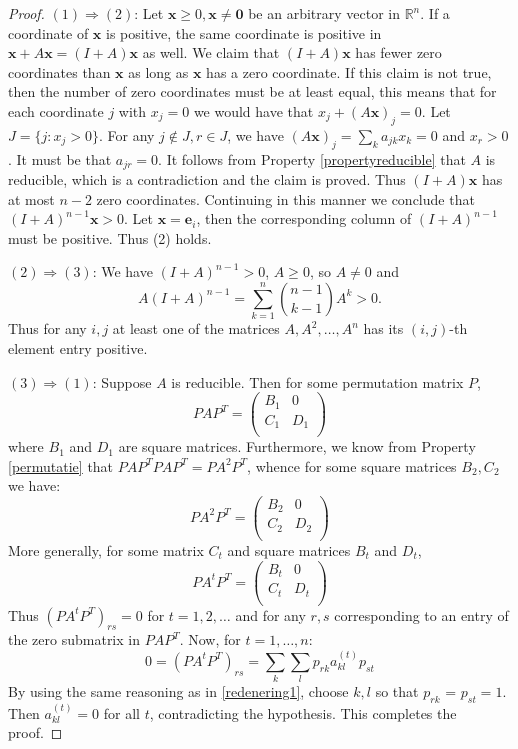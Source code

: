 \documentclass[a4paper,11pt]{report}
\newcommand{\R}{{\mathbb R}}
\begin{document}
\begin{proof}
  
  $(1) \Rightarrow (2)$: Let $\mathbf{x} \geq 0, \mathbf{x} \not = \mathbf{0}$ be an arbitrary vector in $\R^n$.
  If a coordinate of $\mathbf{x}$ is positive, the same coordinate is positive  in $\mathbf{x} + A\mathbf{x} = (I+A)\mathbf{x}$ 
  as well. We claim that $(I+A)\mathbf{x}$ has fewer zero coordinates than 
  $\mathbf{x}$ as long as $\mathbf{x}$ has a zero coordinate. If this claim is 
  not true, then the number of zero coordinates must be at least equal,
  this means that for each coordinate $j$ with $x_j = 0$ we would have that $x_j+ (A\mathbf{x})_j= 0$. Let $J = \{j: x_j > 0\}.$ For any $j \not \in J, r\in J$, we have 
  $(A\mathbf{x})_j = \sum_k a_{jk}x_k = 0$ and $x_r > 0$. 
  It must be that $a_{jr} = 0$. It follows from Property \ref{propertyreducible} that $A$ 
  is reducible, which is a contradiction and the claim is proved. Thus $(I+A)\mathbf{x}$ 
  has at most $n-2$ zero coordinates. Continuing in this manner we conclude that 
  $(I + A)^{n-1}\mathbf{x} > 0$. Let $\mathbf{x} = \mathbf{e}_i$, then the corresponding column of $(I+A)^{n-1}$ must be 
  positive. Thus (2) holds.
  
  $(2) \Rightarrow (3)$: We have $(I + A)^{n-1} > 0$, $A \geq 0$, so $A \not = 0$ 
  and 
  $$A(I+A)^{n-1} = \sum_{k=1}^n {n-1 \choose k-1} A^k > 0.$$
Thus for any $i, j$ at least one of the matrices $A, A^2,\ldots, A^n$ has its 
$(i,j)$-th element entry positive.

$(3) \Rightarrow (1)$: Suppose $A$ is reducible. Then for some permutation 
matrix $P$,
$$PAP^T = \begin{pmatrix}  B_1  & 0\\
 C_1  & D_1\\
\end{pmatrix} $$
where $B_1$ and $D_1$ are square matrices. Furthermore, we know from Property \ref{permutatie} that 
$PAP^TPAP^T = PA^2P^T$,
whence for some square matrices $B_2, C_2$ we have:
$$PA^2P^T = \begin{pmatrix}  B_2  & 0\\
 C_2  & D_2\\
\end{pmatrix} $$
More generally, for some matrix $C_t$ and square matrices $B_t$ and $D_t$,
$$PA^tP^T = \begin{pmatrix}  B_t  & 0\\
 C_t & D_t\\
\end{pmatrix} $$
Thus $(PA^tP^T)_{rs} = 0$ for $t = 1, 2,\ldots$ and for any $r,s$ 
corresponding to an entry of the zero submatrix in $PAP^T$.
Now, for $t = 1,\ldots,n:$
$$0 = (PA^tP^T)_{rs} = \sum_k\sum_l p_{r k}a_{kl}^{(t)}p_{s t}$$
By using the same reasoning as in \ref{redenering1}, choose $k,l$ so that $p_{r k}$ = $p_{s t} = 1$. Then $a^{(t)}_{kl} = 0$ for all $t$,
contradicting the hypothesis. This completes the proof. 
 \end{proof}
 
\end{document}
